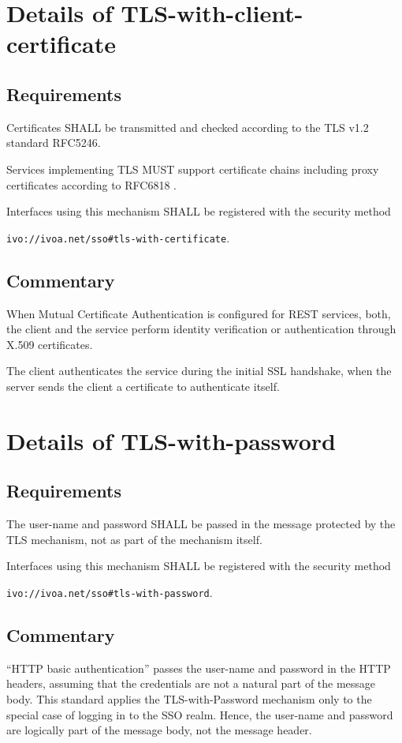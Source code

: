 \documentclass[11pt,a4paper]{ivoa}
\begin{document}
\section{Details of TLS-with-client-certificate}
\subsection{Requirements}
Certificates SHALL be transmitted and checked according to the TLS v1.2 standard RFC5246.

Services implementing TLS MUST support certificate chains including proxy certificates according to RFC6818  \citep{std:RFC6818}.

Interfaces using this mechanism SHALL be  registered with the security method 

\texttt{ivo://ivoa.net/sso\#tls-with-certificate}.

\subsection{Commentary}
When Mutual Certificate Authentication is configured for REST services, both, the client and the service perform 
identity verification or authentication through X.509 certificates. 

The client authenticates the service during the initial SSL handshake, when the server sends the client a certificate to authenticate itself.

\section{Details of TLS-with-password}
\subsection{Requirements}
The user-name and password SHALL be passed in the message protected by the TLS mechanism, 
not as part of the mechanism itself. 

Interfaces using this mechanism SHALL  be registered with the security method 

\texttt{ivo://ivoa.net/sso\#tls-with-password}.

\subsection{Commentary}
``HTTP basic authentication'' passes the user-name and password in the HTTP headers, 
assuming that the credentials are not a natural part of the message body. 
This standard applies the TLS-with-Password mechanism only to the special case of logging in to the SSO realm. 
Hence, the user-name and password are logically part of the message body, not the message header.
\end{document}
